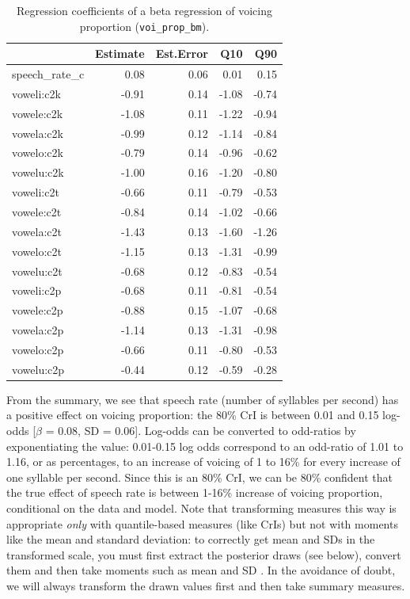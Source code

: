 \documentclass[
  authoryear,
  preprint,
  3p]{elsarticle}
\begin{document}
\begin{longtable}[]{@{}lrrrr@{}}

\caption{\label{tbl-voi-prop-fixef}Regression coefficients of a beta
regression of voicing proportion (\texttt{voi\_prop\_bm}).}

\tabularnewline

\toprule\noalign{}
& Estimate & Est.Error & Q10 & Q90 \\
\midrule\noalign{}
\endhead
\bottomrule\noalign{}
\endlastfoot
speech\_rate\_c & 0.08 & 0.06 & 0.01 & 0.15 \\
voweli:c2k & -0.91 & 0.14 & -1.08 & -0.74 \\
vowele:c2k & -1.08 & 0.11 & -1.22 & -0.94 \\
vowela:c2k & -0.99 & 0.12 & -1.14 & -0.84 \\
vowelo:c2k & -0.79 & 0.14 & -0.96 & -0.62 \\
vowelu:c2k & -1.00 & 0.16 & -1.20 & -0.80 \\
voweli:c2t & -0.66 & 0.11 & -0.79 & -0.53 \\
vowele:c2t & -0.84 & 0.14 & -1.02 & -0.66 \\
vowela:c2t & -1.43 & 0.13 & -1.60 & -1.26 \\
vowelo:c2t & -1.15 & 0.13 & -1.31 & -0.99 \\
vowelu:c2t & -0.68 & 0.12 & -0.83 & -0.54 \\
voweli:c2p & -0.68 & 0.11 & -0.81 & -0.54 \\
vowele:c2p & -0.88 & 0.15 & -1.07 & -0.68 \\
vowela:c2p & -1.14 & 0.13 & -1.31 & -0.98 \\
vowelo:c2p & -0.66 & 0.11 & -0.80 & -0.53 \\
vowelu:c2p & -0.44 & 0.12 & -0.59 & -0.28 \\

\end{longtable}

From the summary, we see that speech rate (number of syllables per
second) has a positive effect on voicing proportion: the 80\% CrI is
between 0.01 and 0.15 log-odds {[}\(\beta\) = 0.08, SD = 0.06{]}.
Log-odds can be converted to odd-ratios by exponentiating the value:
0.01-0.15 log odds correspond to an odd-ratio of 1.01 to 1.16, or as
percentages, to an increase of voicing of 1 to 16\% for every increase
of one syllable per second. Since this is an 80\% CrI, we can be 80\%
confident that the true effect of speech rate is between 1-16\% increase
of voicing proportion, conditional on the data and model. Note that
transforming measures this way is appropriate \emph{only} with
quantile-based measures (like CrIs) but not with moments like the mean
and standard deviation: to correctly get mean and SDs in the transformed
scale, you must first extract the posterior draws (see below), convert
them and then take moments such as mean and SD \citep[for a more
detailed explanation, see][p.~101]{burkner2025}. In the avoidance of
doubt, we will always transform the drawn values first and then take
summary measures.
\end{document}
